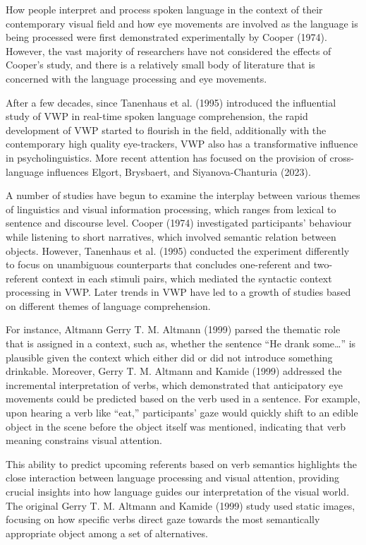\documentclass[
  12pt,
  letterpaper,
  DIV=11,
  numbers=noendperiod]{scrreprt}
\begin{document}
How people interpret and process spoken language in the context of their
contemporary visual field and how eye movements are involved as the
language is being processed were first demonstrated experimentally by
Cooper (1974). However, the vast majority of researchers have not
considered the effects of Cooper's study, and there is a relatively
small body of literature that is concerned with the language processing
and eye movements.

After a few decades, since Tanenhaus et al. (1995) introduced the
influential study of VWP in real-time spoken language comprehension, the
rapid development of VWP started to flourish in the field, additionally
with the contemporary high quality eye-trackers, VWP also has a
transformative influence in psycholinguistics. More recent attention has
focused on the provision of cross-language influences Elgort, Brysbaert,
and Siyanova-Chanturia (2023).

A number of studies have begun to examine the interplay between various
themes of linguistics and visual information processing, which ranges
from lexical to sentence and discourse level. Cooper (1974) investigated
participants' behaviour while listening to short narratives, which
involved semantic relation between objects. However, Tanenhaus et al.
(1995) conducted the experiment differently to focus on unambiguous
counterparts that concludes one-referent and two-referent context in
each stimuli pairs, which mediated the syntactic context processing in
VWP. Later trends in VWP have led to a growth of studies based on
different themes of language comprehension.

For instance, Altmann Gerry T. M. Altmann (1999) parsed the thematic
role that is assigned in a context, such as, whether the sentence ``He
drank some\ldots{}'' is plausible given the context which either did or
did not introduce something drinkable. Moreover, Gerry T. M. Altmann and
Kamide (1999) addressed the incremental interpretation of verbs, which
demonstrated that anticipatory eye movements could be predicted based on
the verb used in a sentence. For example, upon hearing a verb like
``eat,'' participants' gaze would quickly shift to an edible object in
the scene before the object itself was mentioned, indicating that verb
meaning constrains visual attention.

This ability to predict upcoming referents based on verb semantics
highlights the close interaction between language processing and visual
attention, providing crucial insights into how language guides our
interpretation of the visual world. The original Gerry T. M. Altmann and
Kamide (1999) study used static images, focusing on how specific verbs
direct gaze towards the most semantically appropriate object among a set
of alternatives.
\end{document}

